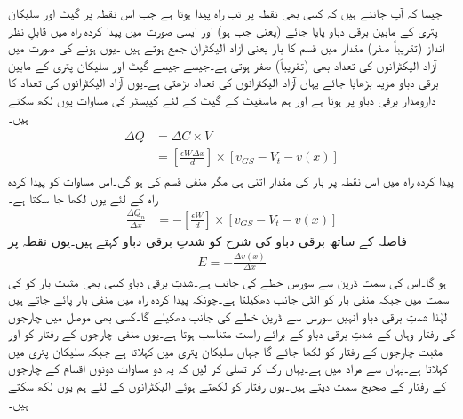 جیسا کہ آپ جانتے ہیں کہ کسی بھی نقطہ   پر تب راہ پیدا ہوتا ہے جب اس نقطہ پر گیٹ اور سلیکان پتری کے مابین  برقی دباو پایا جائے (یعنی جب   ہو) اور ایسی صورت میں پیدا کردہ راہ میں قابلِ نظر انداز (تقریباً صفر) مقدار میں  قسم کا بار یعنی آزاد الیکٹران جمع ہوتے ہیں ۔یوں  ہونے کی صورت میں آزاد الیکٹرانوں کی تعداد بھی (تقریباً) صفر ہوتی ہے۔جیسے جیسے گیٹ اور سلیکان پتری کے مابین برقی دباو مزید بڑھایا جائے یہاں آزاد الیکٹرانوں کی تعداد بڑھتی ہے۔یوں آزاد الیکٹرانوں کی تعداد کا دارومدار برقی دباو  پر ہوتا ہے اور ہم ماسفیٹ کے گیٹ کے لئے کپیسٹر کی مساوات یوں لکھ سکتے ہیں۔
\begin{gather}
\begin{aligned}
\Delta Q&=\Delta C \times V\\
&=\left[\frac{\epsilon W \Delta x}{d} \right ] \times \left[v_{GS}-V_t-v(x) \right ]
\end{aligned}
\end{gather}
پیدا کردہ راہ میں اس نقطہ پر بار کی مقدار اتنی ہی مگر منفی قسم کی ہو گی۔اس مساوات کو پیدا کردہ راہ کے لئے یوں لکھا جا سکتا ہے۔
\begin{align} \label{مساوات_میدانی_راہ_میں_چارج_بالمقابل_فاصلہ}
\frac{\Delta Q_n}{\Delta x}&=-\left[\frac{\epsilon W}{d} \right ] \times \left [v_{GS}-V_t-v(x) \right ]
\end{align}
فاصلہ کے ساتھ برقی دباو کی شرح  کو شدتِ برقی دباو   کہتے ہیں۔یوں نقطہ   پر
\begin{align}
E=-\frac{\Delta v(x)}{\Delta x}
\end{align}
ہو گا۔اس کی سمت ڈرین سے سورس خطے کی جانب ہے۔شدتِ برقی دباو کسی بھی مثبت بار کو  کی سمت میں جبکہ منفی بار کو الٹی جانب دھکیلتا ہے۔چونکہ پیدا کردہ راہ میں منفی بار پائے جاتے ہیں لہٰذا شدتِ برقی دباو انہیں سورس سے ڈرین خطے کی جانب دھکیلے گا۔کسی بھی موصل میں چارجوں کی رفتار وہاں کے شدتِ برقی دباو کے برائے راست متناسب ہوتا ہے۔یوں منفی چارجوں کے رفتار کو  اور مثبت چارجوں کے رفتار کو   لکھا جائے گا جہاں   سلیکان پتری میں   کہلاتا ہے جبکہ   سلیکان پتری میں   کہلاتا ہے۔یہاں  سے مراد  میں  ہے۔یہاں رک کر تسلی کر لیں کہ یہ دو مساوات دونوں اقسام کے چارجوں کے رفتار کے صحیح سمت دیتے ہیں۔یوں رفتار کو  لکھتے ہوئے الیکٹرانوں کے لئے ہم یوں لکھ سکتے ہیں۔
